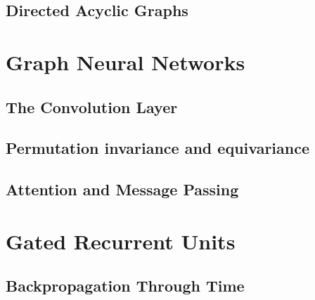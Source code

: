 \subsection{Directed Acyclic Graphs}


\section{Graph Neural Networks}
\subsection{The Convolution Layer}
\subsection{Permutation invariance and equivariance}
\subsection{Attention and Message Passing}


\section{Gated Recurrent Units}
\subsection{Backpropagation Through Time}
